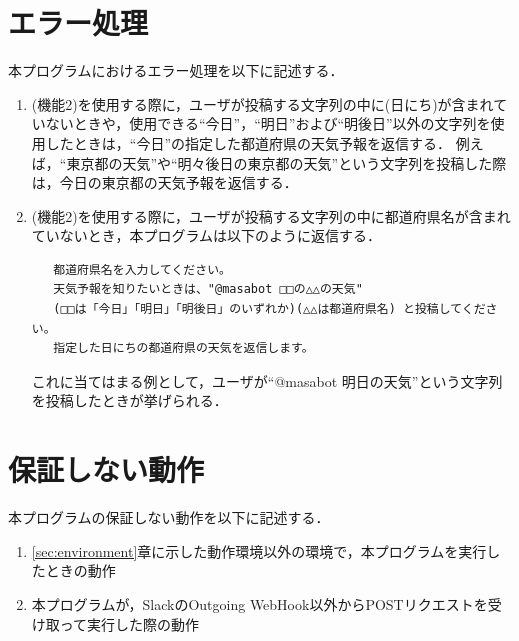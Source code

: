 \documentclass[12pt]{jsarticle}
\begin{document}
\section{エラー処理}
本プログラムにおけるエラー処理を以下に記述する．
\begin{enumerate}
\item (機能2)を使用する際に，ユーザが投稿する文字列の中に(日にち)が含まれていないときや，使用できる``今日''，``明日''および``明後日''以外の文字列を使用したときは，``今日''の指定した都道府県の天気予報を返信する．
  例えば，``東京都の天気''や``明々後日の東京都の天気''という文字列を投稿した際は，今日の東京都の天気予報を返信する．

  \item (機能2)を使用する際に，ユーザが投稿する文字列の中に都道府県名が含まれていないとき，本プログラムは以下のように返信する．
\begin{verbatim}
   都道府県名を入力してください。
   天気予報を知りたいときは、"@masabot □□の△△の天気" 
   (□□は「今日」「明日」「明後日」のいずれか)(△△は都道府県名) と投稿してください。
   指定した日にちの都道府県の天気を返信します。
\end{verbatim}
これに当てはまる例として，ユーザが``@masabot 明日の天気''という文字列を投稿したときが挙げられる．
\end{enumerate}

\section{保証しない動作}
本プログラムの保証しない動作を以下に記述する． 
\begin{enumerate}
\item \ref{sec:environment}章に示した動作環境以外の環境で，本プログラムを実行したときの動作
\item 本プログラムが，SlackのOutgoing WebHook以外からPOSTリクエストを受け取って実行した際の動作
  
\end{enumerate}



\end{document}
